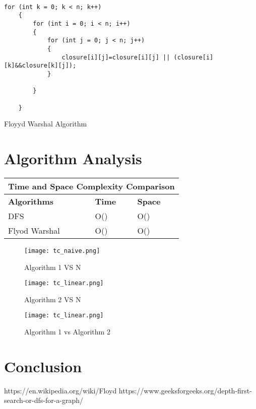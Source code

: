 \documentclass[conference]{IEEEtran}
\begin{document}
\begin{algorithm}[H]
\begin{lstlisting}

for (int k = 0; k < n; k++)
    {
        for (int i = 0; i < n; i++)
        {
            for (int j = 0; j < n; j++)
            {
                closure[i][j]=closure[i][j] || (closure[i][k]&&closure[k][j]);
            }

        }

    }

\end{lstlisting}

 \caption{Floyyd Warshal Algorithm}
\end{algorithm}
\bigskip

\section{Algorithm Analysis}
\bigskip
\begin{tabular}{ |p{3cm}||p{1.5cm}|p{1.5cm}| }
 \hline
 \multicolumn{3}{|c|}{Time and Space Complexity Comparison} \\
 \hline
 \textbf{Algorithms} &  \textbf{Time}& \textbf{Space} \\
 \hline
 DFS    &   O()  & O()\\
 \hline
 Flyod Warshal    &   O()  & O()\\
 \hline
\end{tabular}


\begin{figure}[h!]
\centerline{\texttt{[image: tc\_naive.png]}}
\caption{Algorithm 1 VS N}
\centerline{\textit{ }}
\label{fig:graph}
\end{figure}

\begin{figure}[h!]
\centerline{\texttt{[image: tc\_linear.png]}}
\caption{Algorithm 2 VS N}
\centerline{\textit{ }}
\label{fig:graph}
\end{figure}

\begin{figure}[h!]
\centerline{\texttt{[image: tc\_linear.png]}}
\caption{Algorithm 1 vs Algorithm 2}
\centerline{\textit{ }}
\label{fig:graph}
\end{figure}

\section{Conclusion}


\begin{thebibliography}{00}
https://en.wikipedia.org/wiki/Floyd%
https://www.geeksforgeeks.org/depth-first-search-or-dfs-for-a-graph/
\end{thebibliography}
\end{document}
